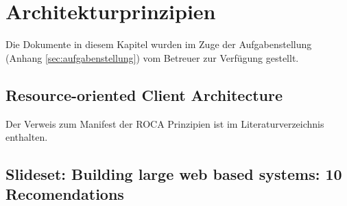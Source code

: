 \chapter{Architekturprinzipien}
\label{sec:appendix-architectural-principles}

Die Dokumente in diesem Kapitel wurden im Zuge der Aufgabenstellung (Anhang \ref{sec:aufgabenstellung}) vom Betreuer zur Verfügung gestellt.

\section{Resource-oriented Client Architecture}
Der Verweis zum Manifest der ROCA Prinzipien \cite{ROCA} ist im Literaturverzeichnis enthalten.

\section{Slideset: Building large web based systems: 10 Recomendations}

